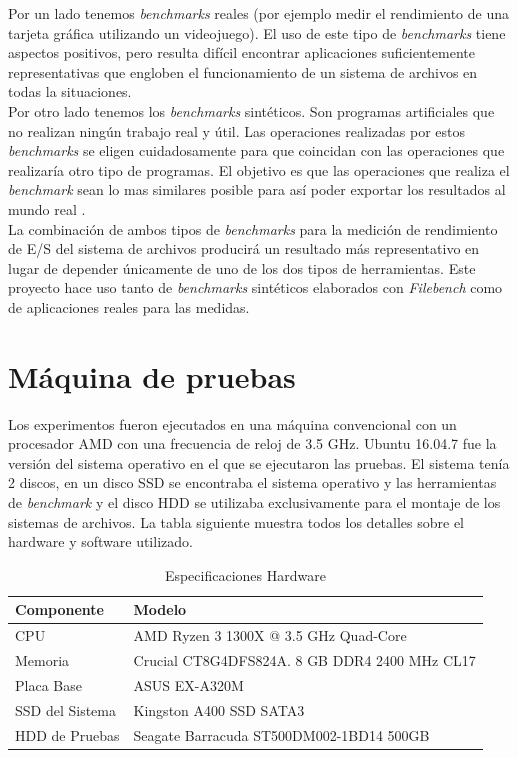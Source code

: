 Por un lado tenemos \textit{benchmarks} reales (por ejemplo medir el rendimiento de una tarjeta gráfica utilizando un videojuego). El uso de este tipo de \textit{benchmarks} tiene aspectos positivos, pero resulta difícil encontrar aplicaciones suficientemente representativas que engloben el funcionamiento de un sistema de archivos en todas la situaciones.\\

Por otro lado tenemos los \textit{benchmarks} sintéticos. Son programas artificiales que no realizan ningún trabajo real y útil. Las operaciones realizadas por estos \textit{benchmarks} se eligen cuidadosamente para que coincidan con las operaciones que realizaría otro tipo de programas. El objetivo es que las operaciones que realiza el \textit{benchmark} sean lo mas similares posible para así poder exportar los resultados al mundo real \cite{lilja_2000}.\\

La combinación de ambos tipos de \textit{benchmarks} para la medición de rendimiento de E/S del sistema de archivos producirá un resultado más representativo en lugar de depender únicamente de uno de los dos tipos de herramientas. Este proyecto hace uso tanto de \textit{benchmarks} sintéticos elaborados con \textit{Filebench} como de aplicaciones reales para las medidas.

\section{Máquina de pruebas}
Los experimentos fueron ejecutados en una máquina convencional con un procesador AMD con una frecuencia de reloj de 3.5 GHz. Ubuntu 16.04.7 fue la versión del sistema operativo en el que se ejecutaron las pruebas. El sistema tenía 2 discos, en un disco SSD se encontraba el sistema operativo y las herramientas de \textit{benchmark} y el disco HDD se utilizaba exclusivamente para el montaje de los sistemas de archivos. La tabla siguiente muestra todos los detalles sobre el hardware y software utilizado.
\begin{table}
    \centering
    \begin{tabular}{|l|l|}
    \hline
        Componente & Modelo \\ \hline\hline
        CPU & AMD Ryzen 3 1300X @ 3.5 GHz Quad-Core \\ \hline
        Memoria & Crucial CT8G4DFS824A. 8 GB DDR4 2400 MHz CL17 \\ \hline
        Placa Base & ASUS EX-A320M \\ \hline
        SSD del Sistema & Kingston A400 SSD SATA3 \\ \hline
        HDD de Pruebas & Seagate Barracuda ST500DM002-1BD14 500GB \\ \hline
    \end{tabular}
    \caption{Especificaciones Hardware}
\label{table:1}
\end{table}

